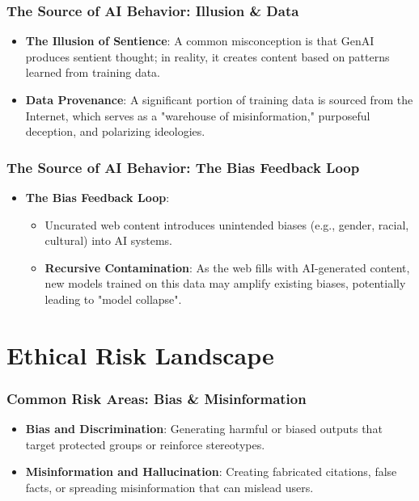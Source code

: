 \documentclass{beamer}
\begin{document}
\begin{frame}
    \frametitle{The Source of AI Behavior: Illusion \& Data}
    \begin{itemize}
        \item \textbf{The Illusion of Sentience}: A common misconception is that GenAI produces sentient thought; in reality, it creates content based on patterns learned from training data.
        \item \textbf{Data Provenance}: A significant portion of training data is sourced from the Internet, which serves as a "warehouse of misinformation," purposeful deception, and polarizing ideologies.
    \end{itemize}
\end{frame}

\begin{frame}
    \frametitle{The Source of AI Behavior: The Bias Feedback Loop}
    \begin{itemize}
        \item \textbf{The Bias Feedback Loop}:
        \begin{itemize}
            \item Uncurated web content introduces unintended biases (e.g., gender, racial, cultural) into AI systems.
            \item \textbf{Recursive Contamination}: As the web fills with AI-generated content, new models trained on this data may amplify existing biases, potentially leading to "model collapse".
        \end{itemize}
    \end{itemize}
\end{frame}

\section{Ethical Risk Landscape}

\begin{frame}
    \frametitle{Common Risk Areas: Bias \& Misinformation}
    \begin{itemize}
        \item \textbf{Bias and Discrimination}: Generating harmful or biased outputs that target protected groups or reinforce stereotypes.
        \item \textbf{Misinformation and Hallucination}: Creating fabricated citations, false facts, or spreading misinformation that can mislead users.
    \end{itemize}
\end{frame}
\end{document}
